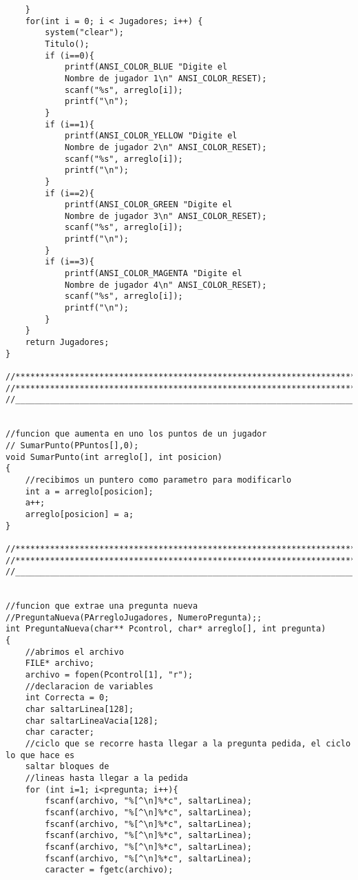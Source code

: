 \begin{verbatim}
    }
    for(int i = 0; i < Jugadores; i++) {
        system("clear");
        Titulo();
        if (i==0){
            printf(ANSI_COLOR_BLUE "Digite el 
            Nombre de jugador 1\n" ANSI_COLOR_RESET);
            scanf("%s", arreglo[i]);
            printf("\n");
        }
        if (i==1){
            printf(ANSI_COLOR_YELLOW "Digite el 
            Nombre de jugador 2\n" ANSI_COLOR_RESET);
            scanf("%s", arreglo[i]);
            printf("\n");
        }
        if (i==2){
            printf(ANSI_COLOR_GREEN "Digite el 
            Nombre de jugador 3\n" ANSI_COLOR_RESET);
            scanf("%s", arreglo[i]);
            printf("\n");
        }
        if (i==3){
            printf(ANSI_COLOR_MAGENTA "Digite el 
            Nombre de jugador 4\n" ANSI_COLOR_RESET);
            scanf("%s", arreglo[i]);
            printf("\n");
        }
    }
    return Jugadores;
}

//*************************************************************************************
//*************************************************************************************
//_____________________________________________________________________________________


//funcion que aumenta en uno los puntos de un jugador
// SumarPunto(PPuntos[],0);
void SumarPunto(int arreglo[], int posicion)
{
    //recibimos un puntero como parametro para modificarlo
    int a = arreglo[posicion];
    a++;
    arreglo[posicion] = a;
}

//*************************************************************************************
//*************************************************************************************
//_____________________________________________________________________________________


//funcion que extrae una pregunta nueva
//PreguntaNueva(PArregloJugadores, NumeroPregunta);;
int PreguntaNueva(char** Pcontrol, char* arreglo[], int pregunta)
{
    //abrimos el archivo
    FILE* archivo;
    archivo = fopen(Pcontrol[1], "r");
    //declaracion de variables
    int Correcta = 0;
    char saltarLinea[128];
    char saltarLineaVacia[128];
    char caracter;
    //ciclo que se recorre hasta llegar a la pregunta pedida, el ciclo lo que hace es 
    saltar bloques de
    //lineas hasta llegar a la pedida
    for (int i=1; i<pregunta; i++){
        fscanf(archivo, "%[^\n]%*c", saltarLinea);
        fscanf(archivo, "%[^\n]%*c", saltarLinea);
        fscanf(archivo, "%[^\n]%*c", saltarLinea);
        fscanf(archivo, "%[^\n]%*c", saltarLinea);
        fscanf(archivo, "%[^\n]%*c", saltarLinea);
        fscanf(archivo, "%[^\n]%*c", saltarLinea);
        caracter = fgetc(archivo);
        

\end{verbatim}
